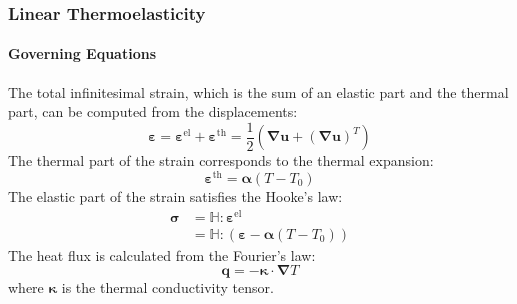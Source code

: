\documentclass[10pt,xcolor=pdftex,dvipsnames,table]{beamer}
\begin{document}
\begin{frame}
	\frametitle{ Linear Thermoelasticity }
	\framesubtitle{ Governing Equations }
	
	The total infinitesimal strain, which is the sum of an elastic part and the thermal part, can be computed from the displacements:
	\begin{equation*}
		\boldsymbol{\varepsilon} 
		= \boldsymbol{\varepsilon}^{\text{el}}+ \boldsymbol{\varepsilon}^{\text{th}} 
		= \frac{1}{2} \left( \boldsymbol{\nabla}\boldsymbol{u} + (\boldsymbol{\nabla}\boldsymbol{u})^T \right) 
	\end{equation*}
	The thermal part of the strain corresponds to the thermal expansion:
	\begin{equation*}
		\boldsymbol{\varepsilon}^{\text{th}} = \boldsymbol{\alpha} (T-T_0)
	\end{equation*}	
	The elastic part of the strain satisfies the Hooke's law:
	\begin{equation*}
		\begin{aligned}
		\boldsymbol{\sigma} 
		&= \mathbb{H}:\boldsymbol{\varepsilon}^{\text{el}} \\
		&= \mathbb{H}: \left( \boldsymbol{\varepsilon} - \boldsymbol{\alpha} (T-T_0)   \right) 
		\end{aligned}
	\end{equation*}
	The heat flux is calculated from the Fourier's law:
	\begin{equation*}
		\boldsymbol{q} = -\boldsymbol{\kappa}\cdot \boldsymbol{\nabla} T
	\end{equation*}	
	where $\boldsymbol{\kappa}$ is the thermal conductivity tensor.
	
\end{frame}
\end{document}

